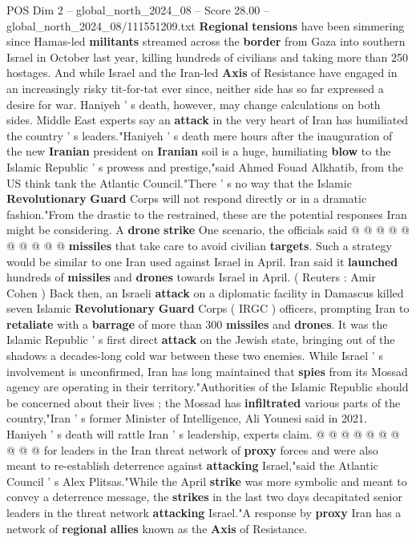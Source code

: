 \begin{textsample}{POS Dim 2 – global\_north\_2024\_08 – Score 28.00 – global\_north\_2024\_08/111551209.txt}  \label{ex:f2_pos_088}
\textbf{Regional} \textbf{tensions} have been simmering since Hamas-led \textbf{militants} streamed across the \textbf{border} from Gaza into southern Israel in October last year, killing hundreds of civilians and taking more than 250 hostages.
And while Israel and the Iran-led \textbf{Axis} of Resistance have engaged in an increasingly risky tit-for-tat ever since, neither side has so far expressed a desire for war.
Haniyeh ' s death, however, may change calculations on both sides.
Middle East experts say an \textbf{attack} in the very heart of Iran has humiliated the country ' s leaders."Haniyeh ' s death mere hours after the inauguration of the new \textbf{Iranian} president on \textbf{Iranian} soil is a huge, humiliating \textbf{blow} to the Islamic Republic ' s prowess and prestige,"said Ahmed Fouad Alkhatib, from the US think tank the Atlantic Council."There ' s no way that the Islamic \textbf{Revolutionary} \textbf{Guard} Corps will not respond directly or in a dramatic fashion."From the drastic to the restrained, these are the potential responses Iran might be considering.
A \textbf{drone} \textbf{strike} One scenario, the officials said @ @ @ @ @ @ @ @ @ @ \textbf{missiles} that take care to avoid civilian \textbf{targets}.
Such a strategy would be similar to one Iran used against Israel in April.
Iran said it \textbf{launched} hundreds of \textbf{missiles} and \textbf{drones} towards Israel in April. ( Reuters : Amir Cohen ) Back then, an Israeli \textbf{attack} on a diplomatic facility in Damascus killed seven Islamic \textbf{Revolutionary} \textbf{Guard} Corps ( IRGC ) officers, prompting Iran to \textbf{retaliate} with a \textbf{barrage} of more than 300 \textbf{missiles} and \textbf{drones}.
It was the Islamic Republic ' s first direct \textbf{attack} on the Jewish state, bringing out of the shadows a decades-long cold war between these two enemies.
While Israel ' s involvement is unconfirmed, Iran has long maintained that \textbf{spies} from its Mossad agency are operating in their territory."Authorities of the Islamic Republic should be concerned about their lives ; the Mossad has \textbf{infiltrated} various parts of the country,"Iran ' s former Minister of Intelligence, Ali Younesi said in 2021.
Haniyeh ' s death will rattle Iran ' s leadership, experts claim. @ @ @ @ @ @ @ @ @ @ for leaders in the Iran threat network of \textbf{proxy} forces and were also meant to re-establish deterrence against \textbf{attacking} Israel,"said the Atlantic Council ' s Alex Plitsas."While the April \textbf{strike} was more symbolic and meant to convey a deterrence message, the \textbf{strikes} in the last two days decapitated senior leaders in the threat network \textbf{attacking} Israel."A response by \textbf{proxy} Iran has a network of \textbf{regional} \textbf{allies} known as the \textbf{Axis} of Resistance.

\end{textsample}
